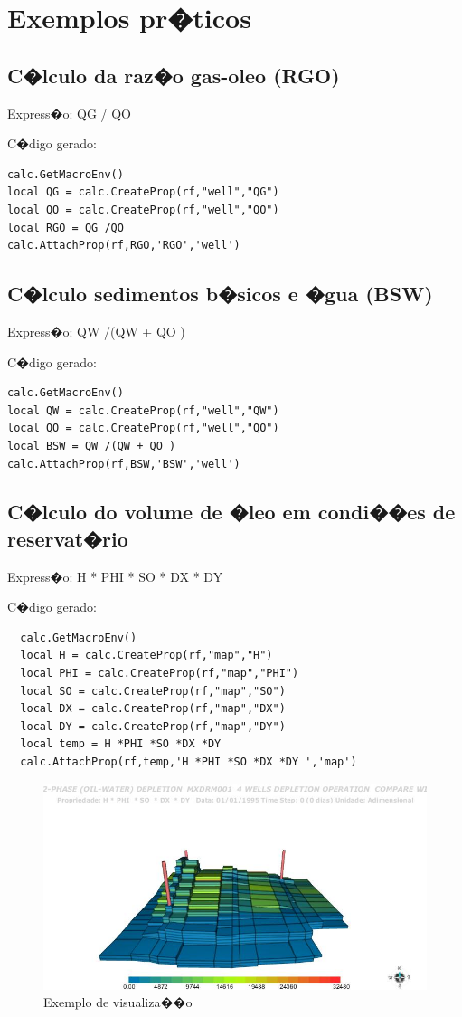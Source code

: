 \documentclass[dissertacao,modelo1,brazil]{ThesisPUC}
\begin{document}
\appendix

\chapter{Exemplos pr�ticos}

\section{C�lculo da raz�o gas-oleo (RGO)}

Express�o: QG / QO

C�digo gerado:

\begin{verbatim}
calc.GetMacroEnv()
local QG = calc.CreateProp(rf,"well","QG")
local QO = calc.CreateProp(rf,"well","QO")
local RGO = QG /QO 
calc.AttachProp(rf,RGO,'RGO','well')
\end{verbatim}

\section{C�lculo sedimentos b�sicos e �gua (BSW)}

Express�o: QW /(QW + QO )

C�digo gerado:

\begin{verbatim}
calc.GetMacroEnv()
local QW = calc.CreateProp(rf,"well","QW")
local QO = calc.CreateProp(rf,"well","QO")
local BSW = QW /(QW + QO )
calc.AttachProp(rf,BSW,'BSW','well')
\end{verbatim}

\section{C�lculo do volume de �leo em condi��es de reservat�rio}

Express�o: H * PHI * SO * DX * DY

C�digo gerado:

\begin{verbatim}
  calc.GetMacroEnv()
  local H = calc.CreateProp(rf,"map","H")
  local PHI = calc.CreateProp(rf,"map","PHI")
  local SO = calc.CreateProp(rf,"map","SO")
  local DX = calc.CreateProp(rf,"map","DX")
  local DY = calc.CreateProp(rf,"map","DY")
  local temp = H *PHI *SO *DX *DY
  calc.AttachProp(rf,temp,'H *PHI *SO *DX *DY ','map')
\end{verbatim}



\begin{figure}
   \includegraphics[bb= 0 0 523 348,width=\textwidth]{vis4.JPG}
   \caption{Exemplo de visualiza��o}
 \end{figure}
\end{document}
